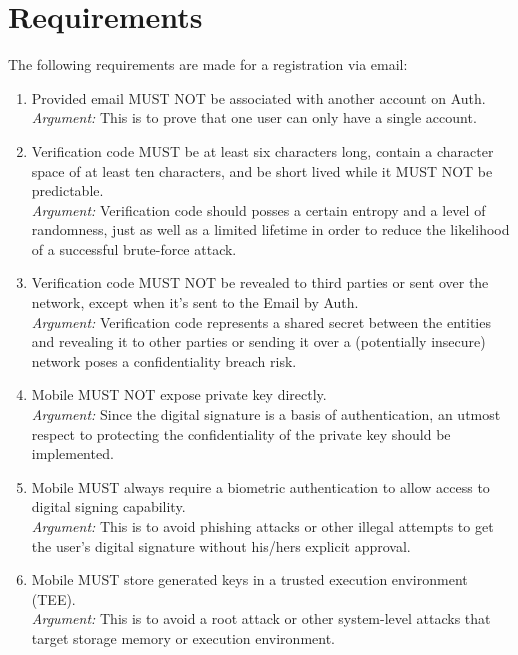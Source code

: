 \section{Requirements}
The following requirements are made for a registration via email:
    \begin{enumerate}
            \item Provided email MUST NOT be associated with another account on Auth.\\
            \textit{Argument:} This is to prove that one user can only have a single account.

            \item Verification code MUST be at least six characters long, contain a character space of at least ten 
                characters, and be short lived while it MUST NOT be predictable.\\     
            \textit{Argument:} Verification code should posses a certain entropy and a level of randomness, 
            just as well as a limited lifetime in order to reduce the likelihood of a 
            successful brute-force attack.

            \item Verification code MUST NOT be revealed to third parties or sent over the network, except when
                it's sent to the Email by Auth.\\        
            \textit{Argument:} Verification code represents a shared secret between the entities and revealing 
            it to other parties or sending it over a (potentially insecure) network poses 
            a confidentiality breach risk. 

            \item Mobile MUST NOT expose private key directly.\\
            \textit{Argument:} Since the digital signature is a basis of authentication, an utmost respect to 
            protecting the confidentiality of the private key should be implemented.

            \item Mobile MUST always require a biometric authentication to allow access to digital signing 
                capability.\\        
            \textit{Argument:} This is to avoid phishing attacks or other illegal attempts to get the user's 
            digital signature without his/hers explicit approval.

            \item Mobile MUST store generated keys in a trusted execution environment (TEE).\\        
            \textit{Argument:} This is to avoid a root attack or other system-level attacks that target storage 
            memory or execution environment.


\end{enumerate}

